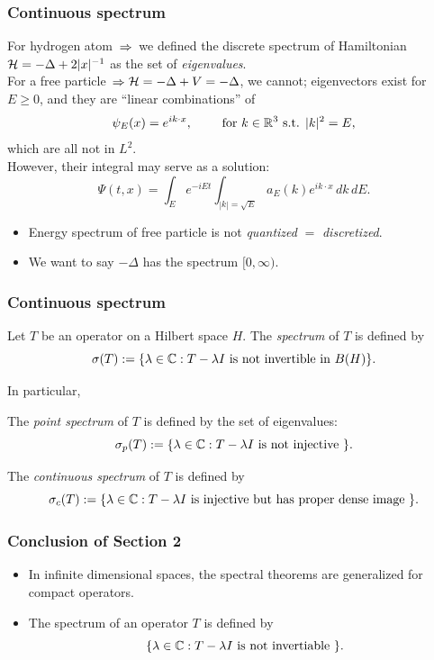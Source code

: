 \documentclass[10pt,handout]{beamer}
\begin{document}
\begin{frame}
\frametitle{Continuous spectrum}
  For hydrogen atom $\impl$ we defined the discrete spectrum of Hamiltonian $\mathcal{H}=-\Delta+2|x|^{-1}$ as the set of \emph{eigenvalues}.\\
  \bigskip
  \pause For a free particle $\impl$\pause$\mathcal{H}=-\Delta+V=-\Delta$, we cannot; eigenvectors exist for $E\ge0$, and they are ``linear combinations'' of
  \[\psi_E(x)=e^{ik\cdot x},\qquad\text{ for }k\in\mathbb{R}^3\text{ s.t. }|k|^2=E,\]
  which are all not in $L^2$.\\
  \bigskip
  \pause However, their integral may serve as a solution:
  \[\Psi(t,x)=\int_Ee^{-iEt}\int_{|k|=\sqrt E}a_E(k)e^{ik\cdot x}\,dk\,dE.\]
  \pause
  \begin{itemize}
    \item Energy spectrum of free particle is not \emph{quantized} $=$ \emph{discretized}.
    \item We want to say $-\Delta$ has the spectrum $[0,\infty)$.
  \end{itemize}
\end{frame}

\begin{frame}
\frametitle{Continuous spectrum}
  \begin{defn}
    Let $T$ be an operator on a Hilbert space $H$.
    The \emph{spectrum} of $T$ is defined by
    \[\sigma(T):=\{\lambda\in\mathbb{C}:T-\lambda I\text{ is not invertible in }B(H)\}.\]
  \end{defn}
  \pause In particular,
  \begin{defn}
    The \emph{point spectrum} of $T$ is defined by the set of eigenvalues:
    \[\sigma_p(T):=\{\lambda\in\mathbb{C}:T-\lambda I\text{ is not injective }\}.\]
  \end{defn}
  \vspace{-1em}
  \begin{defn}
    The \emph{continuous spectrum} of $T$ is defined by
    \[\sigma_c(T):=\{\lambda\in\mathbb{C}:T-\lambda I\text{ is injective but has proper dense image }\}.\]
  \end{defn}
\end{frame}

\begin{frame}
\frametitle{Conclusion of Section 2}
  \begin{itemize}
    \item In infinite dimensional spaces, the spectral theorems are generalized for compact operators.
    \item The spectrum of an operator $T$ is defined by
    \[\{\lambda\in\mathbb{C}:T-\lambda I\text{ is not invertiable }\}.\]
  \end{itemize}
\end{frame}
\end{document}
